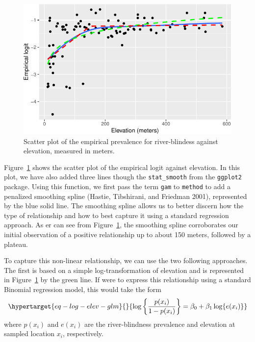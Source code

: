 \documentclass[
  letterpaper,
]{krantz}
\begin{document}
\begin{figure}[H]

{\centering \includegraphics{03_model-fitting_files/figure-pdf/fig-elogit-elev-liberia-1.pdf}

}

\caption{\label{fig-elogit-elev-liberia}Scatter plot of the empirical
prevalence for river-blindess against elevation, measured in meters.}

\end{figure}

Figure~\ref{fig-elogit-elev-liberia} shows the scatter plot of the
empirical logit against elevation. In this plot, we have also added
three lines though the \texttt{stat\_smooth} from the \texttt{ggplot2}
package. Using this function, we first pass the term \texttt{gam} to
\texttt{method} to add a penalized smoothing spline (Hastie, Tibshirani,
and Friedman 2001), represented by the blue solid line. The smoothing
spline allows us to better discern how the type of relationship and how
to best capture it using a standard regression approach. As er can see
from Figure~\ref{fig-elogit-elev-liberia}, the smoothing spline
corroborates our initial observation of a positive relationship up to
about 150 meters, followed by a plateau.

To capture this non-linear relationship, we can use the two following
approaches. The first is based on a simple log-transformation of
elevation and is represented in Figure~\ref{fig-elogit-elev-liberia} by
the green line. If were to express this relationship using a standard
Binomial regression model, this would take the form
\begin{equation}\protect\hypertarget{eq-log-elev-glm}{}{
\log\left\{\frac{p(x_i)}{1-p(x_i)}\right\} = \beta_0 + \beta_1 \log\{e(x_i)\}
}\label{eq-log-elev-glm}\end{equation} where \(p(x_i)\) and \(e(x_i)\)
are the river-blindness prevalence and elevation at sampled location
\(x_i\), respectively.
\end{document}
